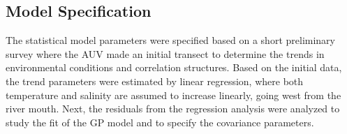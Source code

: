 \documentclass[aoas]{imsart}
\begin{document}
\subsection{Model Specification}
\label{sec:exp_modeling}

The statistical model parameters were specified based on a short
preliminary survey where the AUV made an initial transect to determine
the trends in environmental conditions and correlation
structures. Based on the initial data, the trend parameters were
estimated by linear regression, where both temperature and salinity
are assumed to increase linearly, going west from the river
mouth. Next, the residuals from the regression analysis were analyzed
to study the fit of the GP model and to specify the covariance
parameters.

\end{document}
